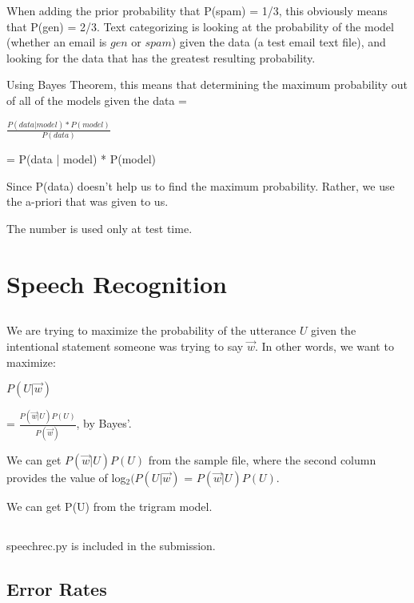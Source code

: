 \documentclass[12pt, letterpaper]{article}
\begin{document}
When adding the prior probability that P(spam) = 1/3, this obviously means that P(gen) = 2/3. Text categorizing is looking at the probability of the model (whether an email is $gen$ or $spam$) given the data (a test email text file), and looking for the data that has the greatest resulting probability.

Using Bayes Theorem, this means that determining the maximum probability out of all of the models given the data = 

$\frac{P(data | model) * P(model)}{P(data)}$ 

= P(data | model) * P(model)

Since P(data) doesn't help us to find the maximum probability. Rather, we use the a-priori that was given to us. 


The number is used only at test time.

\section{Speech Recognition}
\subsection{}


We are trying to maximize the probability of the utterance $U$ given the intentional statement someone was trying to say $\overrightarrow{w}$. In other words, we want to maximize: 

$P(U|\overrightarrow{w})$

= $\frac{P(\overrightarrow{w}|U) P(U)}{P(\overrightarrow{w})}$, by Bayes'.

We can get $P(\overrightarrow{w}|U) P(U)$ from the sample file, where the second column provides the value of log$_{2}(P(U|\overrightarrow{w})$ = $P(\overrightarrow{w}|U) P(U)$.

We can get P(U) from the trigram model. 

\subsection{}
speechrec.py is included in the submission.

\subsection{Error Rates}
\end{document}
